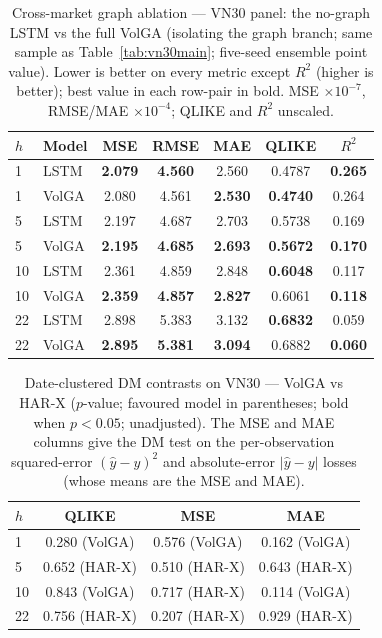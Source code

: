 \documentclass{llncs}
\begin{document}
\begin{table}[t]
\centering
\caption{Cross-market graph ablation --- VN30 panel: the no-graph LSTM vs the full VolGA (isolating the graph branch; same sample as Table~\ref{tab:vn30main}; five-seed ensemble point value). Lower is better on every metric except $R^2$ (higher is better); best value in each row-pair in bold. MSE $\times10^{-7}$, RMSE/MAE $\times10^{-4}$; QLIKE and $R^2$ unscaled.}
\label{tab:vn30graph}
\footnotesize
\setlength{\tabcolsep}{6pt}
\begin{tabular}{llccccc}
\toprule
$h$ & Model & MSE & RMSE & MAE & QLIKE & $R^2$ \\
\midrule
1 & LSTM & \textbf{2.079} & \textbf{4.560} & 2.560 & 0.4787 & \textbf{0.265} \\
1 & VolGA & 2.080 & 4.561 & \textbf{2.530} & \textbf{0.4740} & 0.264 \\
\midrule
5 & LSTM & 2.197 & 4.687 & 2.703 & 0.5738 & 0.169 \\
5 & VolGA & \textbf{2.195} & \textbf{4.685} & \textbf{2.693} & \textbf{0.5672} & \textbf{0.170} \\
\midrule
10 & LSTM & 2.361 & 4.859 & 2.848 & \textbf{0.6048} & 0.117 \\
10 & VolGA & \textbf{2.359} & \textbf{4.857} & \textbf{2.827} & 0.6061 & \textbf{0.118} \\
\midrule
22 & LSTM & 2.898 & 5.383 & 3.132 & \textbf{0.6832} & 0.059 \\
22 & VolGA & \textbf{2.895} & \textbf{5.381} & \textbf{3.094} & 0.6882 & \textbf{0.060} \\
\bottomrule
\end{tabular}
\end{table}

\begin{table}[t]
\centering
\caption{Date-clustered DM contrasts on VN30 --- VolGA vs HAR-X ($p$-value; favoured model in
parentheses; bold when $p<0.05$; unadjusted).
The MSE and MAE columns give the DM test on the per-observation squared-error $(\hat{y}-y)^2$ and absolute-error $|\hat{y}-y|$ losses (whose means are the MSE and MAE).}
\label{tab:dm-vn30-harx}
\footnotesize
\setlength{\tabcolsep}{8pt}
\begin{tabular}{lccc}
\toprule
$h$ & QLIKE & MSE & MAE \\
\midrule
1 & 0.280 (VolGA) & 0.576 (VolGA) & 0.162 (VolGA) \\
5 & 0.652 (HAR-X) & 0.510 (HAR-X) & 0.643 (HAR-X) \\
10 & 0.843 (VolGA) & 0.717 (HAR-X) & 0.114 (VolGA) \\
22 & 0.756 (HAR-X) & 0.207 (HAR-X) & 0.929 (HAR-X) \\
\bottomrule
\end{tabular}
\end{table}
\end{document}
